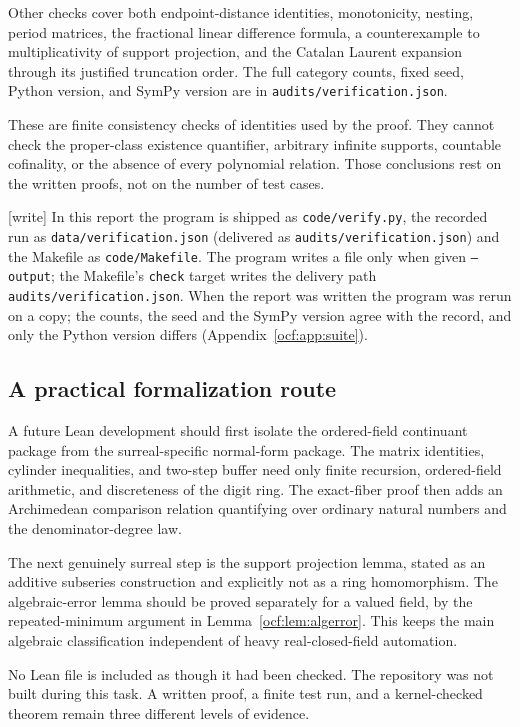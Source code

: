 \documentclass[11pt,a4paper]{article}
\numberwithin{equation}{section}
\theoremstyle{definition}
\theoremstyle{remark}
\newcommand{\rpath}[1]{\nolinkurl{#1}}%
\newcommand{\wtag}{\textup{[write]}}%
\begin{document}
Other checks cover both endpoint-distance identities, monotonicity,
nesting, period matrices, the fractional linear difference formula, a
counterexample to multiplicativity of support projection, and the Catalan
Laurent expansion through its justified truncation order. The full
category counts, fixed seed, Python version, and SymPy version are in
\texttt{audits/verification.json}.

These are finite consistency checks of identities used by the proof. They
cannot check the proper-class existence quantifier, arbitrary infinite
supports, countable cofinality, or the absence of every polynomial
relation. Those conclusions rest on the written proofs, not on the number
of test cases.

\wtag{} In this report the program is shipped as \rpath{code/verify.py},
the recorded run as \rpath{data/verification.json} (delivered as
\texttt{audits/verification.json}) and the Makefile as
\rpath{code/Makefile}. The program writes a file only when given
\texttt{--output}; the Makefile's \texttt{check} target writes the delivery
path \texttt{audits/verification.json}. When the report was written the
program was rerun on a copy; the counts, the seed and the SymPy version
agree with the record, and only the Python version differs
(Appendix~\ref{ocf:app:suite}).

\subsection{A practical formalization route}\label{ocf:sub:formal}

A future Lean development should first isolate the ordered-field
continuant package from the surreal-specific normal-form package. The
matrix identities, cylinder inequalities, and two-step buffer need only
finite recursion, ordered-field arithmetic, and discreteness of the digit
ring. The exact-fiber proof then adds an Archimedean comparison relation
quantifying over ordinary natural numbers and the denominator-degree law.

The next genuinely surreal step is the support projection lemma, stated
as an additive subseries construction and explicitly not as a ring
homomorphism. The algebraic-error lemma should be proved separately for a
valued field, by the repeated-minimum argument in
Lemma~\ref{ocf:lem:algerror}. This keeps the main algebraic classification
independent of heavy real-closed-field automation.

No Lean file is included as though it had been checked. The repository
was not built during this task. A written proof, a finite test run, and a
kernel-checked theorem remain three different levels of evidence.
\end{document}
